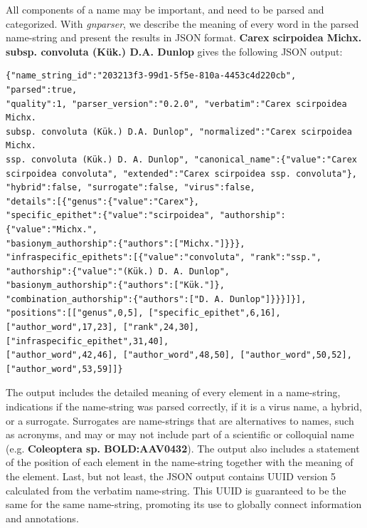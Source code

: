 \documentclass{bmcart}
\begin{document}

All components of a name may be important, and need to be parsed and
categorized. With \textit{gnparser}, we describe the meaning of every word in the parsed
name-string and present the results in JSON format.  \textbf{Carex scirpoidea Michx.
subsp. convoluta (Kük.) D.A. Dunlop} gives the following JSON output:

\vspace{0.5cm}

\begin{Verbatim}[fontsize=\small]
{"name_string_id":"203213f3-99d1-5f5e-810a-4453c4d220cb", "parsed":true,
"quality":1, "parser_version":"0.2.0", "verbatim":"Carex scirpoidea Michx.
subsp. convoluta (Kük.) D.A. Dunlop", "normalized":"Carex scirpoidea Michx.
ssp. convoluta (Kük.) D. A. Dunlop", "canonical_name":{"value":"Carex
scirpoidea convoluta", "extended":"Carex scirpoidea ssp. convoluta"},
"hybrid":false, "surrogate":false, "virus":false,
"details":[{"genus":{"value":"Carex"},
"specific_epithet":{"value":"scirpoidea", "authorship":{"value":"Michx.",
"basionym_authorship":{"authors":["Michx."]}}},
"infraspecific_epithets":[{"value":"convoluta", "rank":"ssp.",
"authorship":{"value":"(Kük.) D. A. Dunlop",
"basionym_authorship":{"authors":["Kük."]},
"combination_authorship":{"authors":["D. A. Dunlop"]}}}]}],
"positions":[["genus",0,5], ["specific_epithet",6,16],
["author_word",17,23], ["rank",24,30], ["infraspecific_epithet",31,40],
["author_word",42,46], ["author_word",48,50], ["author_word",50,52],
["author_word",53,59]]}
\end{Verbatim}

\vspace{0.5cm}




The output includes the detailed meaning of every element in a name-string,
indications if the name-string was parsed correctly, if it is a virus name, a 
hybrid, or a surrogate. Surrogates are name-strings that are alternatives to
names, such as acronyms, and may or may not include part of a scientific or
colloquial name (e.g. \textbf{Coleoptera sp. BOLD:AAV0432}). The output also
includes a statement of the position of each element in the name-string
together with the meaning of the element.  Last, but not least, the JSON output contains UUID version 5 calculated from
the verbatim name-string. This UUID is guaranteed to be the same for the same
name-string, promoting its use to globally connect information and annotations.
\end{document}
